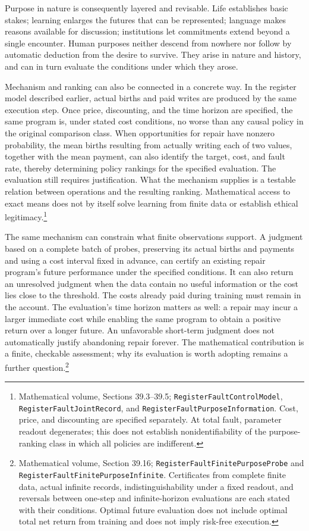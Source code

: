 \documentclass[
  english,
  11pt,
  oneside]{book}
\begin{document}
Purpose in nature is consequently layered and revisable. Life establishes basic stakes; learning enlarges the futures that can be represented; language makes reasons available for discussion; institutions let commitments extend beyond a single encounter. Human purposes neither descend from nowhere nor follow by automatic deduction from the desire to survive. They arise in nature and history, and can in turn evaluate the conditions under which they arose.

Mechanism and ranking can also be connected in a concrete way. In the register model described earlier, actual births and paid writes are produced by the same execution step. Once price, discounting, and the time horizon are specified, the same program is, under stated cost conditions, no worse than any causal policy in the original comparison class. When opportunities for repair have nonzero probability, the mean births resulting from actually writing each of two values, together with the mean payment, can also identify the target, cost, and fault rate, thereby determining policy rankings for the specified evaluation. The evaluation still requires justification. What the mechanism supplies is a testable relation between operations and the resulting ranking. Mathematical access to exact means does not by itself solve learning from finite data or establish ethical legitimacy.\footnote{\hypertarget{ph-note-30}{}Mathematical volume, Sections 39.3--39.5; \nolinkurl{RegisterFaultControlModel}, \texttt{RegisterFaultJointRecord}, and \nolinkurl{RegisterFaultPurposeInformation}. Cost, price, and discounting are specified separately. At total fault, parameter readout degenerates; this does not establish nonidentifiability of the purpose-ranking class in which all policies are indifferent.}

The same mechanism can constrain what finite observations support. A judgment based on a complete batch of probes, preserving its actual births and payments and using a cost interval fixed in advance, can certify an existing repair program's future performance under the specified conditions. It can also return an unresolved judgment when the data contain no useful information or the cost lies close to the threshold. The costs already paid during training must remain in the account. The evaluation's time horizon matters as well: a repair may incur a larger immediate cost while enabling the same program to obtain a positive return over a longer future. An unfavorable short-term judgment does not automatically justify abandoning repair forever. The mathematical contribution is a finite, checkable assessment; why its evaluation is worth adopting remains a further question.\footnote{\hypertarget{ph-note-31}{}Mathematical volume, Section 39.16; \nolinkurl{RegisterFaultFinitePurposeProbe} and \nolinkurl{RegisterFaultFinitePurposeInfinite}. Certificates from complete finite data, actual infinite records, indistinguishability under a fixed readout, and reversals between one-step and infinite-horizon evaluations are each stated with their conditions. Optimal future evaluation does not include optimal total net return from training and does not imply risk-free execution.}
\end{document}
